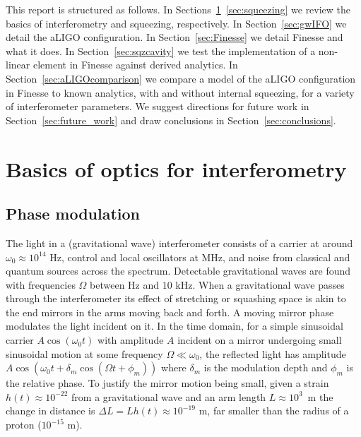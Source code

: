 \documentclass[aps,pra,superscriptaddress,reprint,nofootinbib]{revtex4-1}
\begin{document}
This report is structured as follows.
In Sections~\ref{sec:basics}~\ref{sec:squeezing} we review the basics of interferometry and squeezing, respectively. In Section~\ref{sec:gwIFO} we detail the aLIGO configuration.
In Section~\ref{sec:Finesse} we detail Finesse and what it does.
In Section~\ref{sec:sqzcavity} we test the implementation of a non-linear element in Finesse against derived analytics. %
In Section~\ref{sec:aLIGOcomparison} we compare a model of the aLIGO configuration in Finesse to known analytics, with and without internal squeezing, for a variety of interferometer parameters.
We suggest directions for future work in Section~\ref{sec:future_work} and draw conclusions in Section~\ref{sec:conclusions}.


\section{Basics of optics for interferometry}
\label{sec:basics}

\subsection{Phase modulation}

The light in a (gravitational wave) interferometer consists of a carrier at around $\omega_0 \approx 10^{14}$ Hz, control and local oscillators at MHz, and noise from classical and quantum sources across the spectrum. Detectable gravitational waves are found with frequencies $\Omega$ between Hz and $10$ kHz. When a gravitational wave passes through the interferometer its effect of stretching or squashing space is akin to the end mirrors in the arms moving back and forth. A moving mirror phase modulates the light incident on it. In the time domain, for a simple sinusoidal carrier $A \cos(\omega_0 t)$ with amplitude $A$ incident on a mirror undergoing small sinusoidal motion at some frequency $\Omega \ll \omega_0$, the reflected light has amplitude $A \cos(\omega_0 t + \delta_m \cos(\Omega t + \phi_m))$ where $\delta_m$ is the modulation depth and $\phi_m$ is the relative phase. To justify the mirror motion being small, given a strain $h(t) \approx 10^{-22}$ from a gravitational wave and an arm length $L \approx 10^3$~m the change in distance is $\Delta L = L h(t) \approx 10^{-19}$ m, far smaller than the radius of a proton ($10^{-15}$ m).
\end{document}
